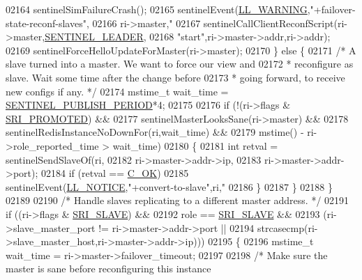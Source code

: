 \begin{DoxyCode}
{{{{{{{{{{{{{{{{{{{{{{{{{{{{{{{{{{{{{{{{{{{02164                 sentinelSimFailureCrash();
02165             sentinelEvent(\hyperlink{server_8h_a31229b9334bba7d6be2a72970967a14b}{LL\_WARNING},\textcolor{stringliteral}{"+failover-state-reconf-slaves"},
02166                 ri->master,\textcolor{stringliteral}{"%
02167             sentinelCallClientReconfScript(ri->master,\hyperlink{sentinel_8c_a896cefcd7c6cbd3467b2387ec944fffd}{SENTINEL\_LEADER},
02168                 \textcolor{stringliteral}{"start"},ri->master->addr,ri->addr);
02169             sentinelForceHelloUpdateForMaster(ri->master);
02170         \} \textcolor{keywordflow}{else} \{
02171             \textcolor{comment}{/* A slave turned into a master. We want to force our view and}
02172 \textcolor{comment}{             * reconfigure as slave. Wait some time after the change before}
02173 \textcolor{comment}{             * going forward, to receive new configs if any. */}
02174             mstime\_t wait\_time = \hyperlink{sentinel_8c_a062c8bab2521f90dac2df11cf77c3bf0}{SENTINEL\_PUBLISH\_PERIOD}*4;
02175 
02176             \textcolor{keywordflow}{if} (!(ri->flags & \hyperlink{sentinel_8c_a6c6c019b1af48a9c0e9507422051c684}{SRI\_PROMOTED}) &&
02177                  sentinelMasterLooksSane(ri->master) &&
02178                  sentinelRedisInstanceNoDownFor(ri,wait\_time) &&
02179                  mstime() - ri->role\_reported\_time > wait\_time)
02180             \{
02181                 \textcolor{keywordtype}{int} retval = sentinelSendSlaveOf(ri,
02182                         ri->master->addr->ip,
02183                         ri->master->addr->port);
02184                 \textcolor{keywordflow}{if} (retval == \hyperlink{server_8h_a303769ef1065076e68731584e758d3e1}{C\_OK})
02185                     sentinelEvent(\hyperlink{server_8h_a8c54c191e436c7dd3012167212692401}{LL\_NOTICE},\textcolor{stringliteral}{"+convert-to-slave"},ri,\textcolor{stringliteral}{"%
02186             \}
02187         \}
02188     \}
02189 
02190     \textcolor{comment}{/* Handle slaves replicating to a different master address. */}
02191     \textcolor{keywordflow}{if} ((ri->flags & \hyperlink{sentinel_8c_a4b9db21eda79d49bd9fdf2cf7b3178e8}{SRI\_SLAVE}) &&
02192         role == \hyperlink{sentinel_8c_a4b9db21eda79d49bd9fdf2cf7b3178e8}{SRI\_SLAVE} &&
02193         (ri->slave\_master\_port != ri->master->addr->port ||
02194          strcasecmp(ri->slave\_master\_host,ri->master->addr->ip)))
02195     \{
02196         mstime\_t wait\_time = ri->master->failover\_timeout;
02197 
02198         \textcolor{comment}{/* Make sure the master is sane before reconfiguring this instance}
}}}}}}}}}}}}}}}}}}}}}}}}}}}}}}}}}}}}}}}}}}}}}
\end{DoxyCode}
